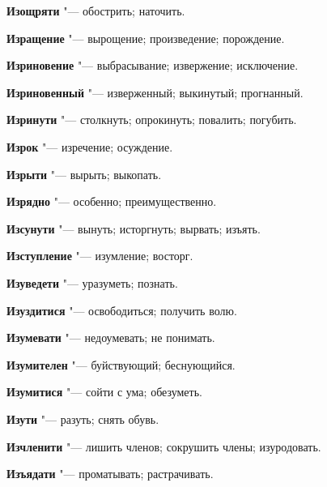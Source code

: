 \begin{mymulticols}{2}
\noindent\textbf{Изощряти} "--- обострить; наточить. 




\noindent\textbf{Изращение} "--- вырощение; произведение; порождение. 




\noindent\textbf{Изриновение} "--- выбрасывание; извержение; исключение. 




\noindent\textbf{Изриновенный} "--- изверженный; выкинутый; прогнанный. 




\noindent\textbf{Изринути} "--- столкнуть; опрокинуть; повалить; погубить. 




\noindent\textbf{Изрок} "--- изречение; осуждение. 




\noindent\textbf{Изрыти} "--- вырыть; выкопать. 




\noindent\textbf{Изрядно} "--- особенно; преимущественно. 




\noindent\textbf{Изсунути} "--- вынуть; исторгнуть; вырвать; изъять. 




\noindent\textbf{Изступление} "--- изумление; восторг. 




\noindent\textbf{Изуведети} "--- уразуметь; познать. 




\noindent\textbf{Изуздитися} "--- освободиться; получить волю. 




\noindent\textbf{Изумевати} "--- недоумевать; не понимать. 




\noindent\textbf{Изумителен} "--- буйствующий; беснующийся. 




\noindent\textbf{Изумитися} "--- сойти с ума; обезуметь. 




\noindent\textbf{Изути} "--- разуть; снять обувь. 




\noindent\textbf{Изчленити} "--- лишить членов; сокрушить члены; изуродовать. 




\noindent\textbf{Изъядати} "--- проматывать; растрачивать. 





\end{mymulticols}
